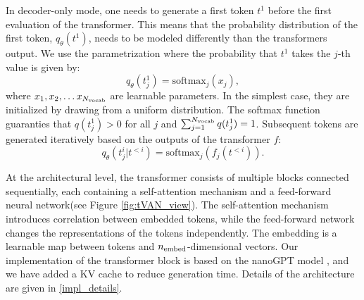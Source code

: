 \documentclass[3p, times,merge]{elsarticle}
\begin{document}
In decoder-only mode, one needs to generate a first token $t^1$ before the first evaluation of the transformer. This means that the probability distribution of the first token, $q_\theta(t^1)$, needs to be modeled differently than the transformers output. We use the parametrization where the probability that $t^1$ takes the $j$-th value is given by:
\begin{equation}
    q_\theta(t^{1}_j) = \text{softmax}_j(x_j),
\end{equation}
where 
$x_1,x_2,\ldots x_{N_{\rm vocab}}$ are learnable parameters. In the simplest case, they are initialized by drawing from a uniform distribution. The softmax function guaranties that $q(t^{1}_j)>0$ for all $j$ and $\sum_{j=1}^{N_{\rm vocab}} q(t^{1}_j) =1$. 
Subsequent tokens are generated iteratively based on the outputs of the transformer $f$:
\begin{equation}
q_\theta(t^{i}_{j}|t^{<i}) = \text{softmax}_{j}\left( f_{j}(t^{<i}) \right).
\label{no_AP_con_prob}
\end{equation}


At the architectural level, the transformer consists of multiple blocks connected sequentially, each containing a self-attention mechanism and a feed-forward neural network(see Figure \ref{fig:tVAN_view}). The self-attention mechanism introduces correlation between embedded tokens, while the feed-forward network changes the representations of the tokens independently. The embedding is a learnable map between tokens and $n_{\rm embed}$-dimensional vectors. Our implementation of the transformer block is based on the nanoGPT model \cite{nanoGPT}, and we have added a KV cache to reduce generation time. Details of the architecture are given in \ref{impl_details}.
\end{document}
